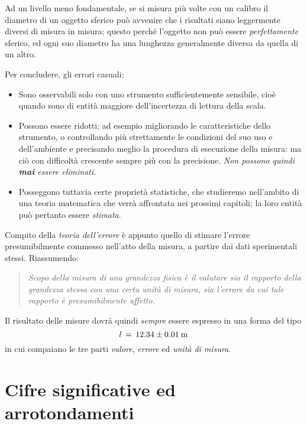 Ad un livello meno fondamentale, se si misura pi\`u volte
con un calibro il diametro di un oggetto sferico pu\`o
avvenire che i risultati siano leggermente diversi di misura
in misura; questo perch\'e l'oggetto non pu\`o essere
\emph{perfettamente} sferico, ed ogni suo diametro ha una
lunghezza generalmente diversa da quella di un altro.

Per concludere, gli errori casuali:
\begin{itemize}
\item Sono osservabili solo con uno strumento
  sufficientemente sensibile, cio\`e quando sono di entit\`a
  maggiore dell'incertezza di lettura della scala.
\item Possono essere ridotti; ad esempio migliorando le
  caratteristiche dello strumento, o controllando pi\`u
  strettamente le condizioni del suo uso e dell'ambiente e
  precisando meglio la procedura di esecuzione della misura:
  ma ci\`o con difficolt\`a crescente sempre pi\`u con la
  precisione.  \emph{Non possono quindi \textbf{mai} essere
    eliminati}.
\item Posseggono tuttavia certe propriet\`a statistiche, che
  studieremo nell'ambito di una teoria matematica che
  verr\`a affrontata nei prossimi capitoli; la loro entit\`a
  pu\`o pertanto essere \emph{stimata}.
\end{itemize}%

Compito della \emph{teoria dell'errore} \`e appunto quello
di stimare l'errore presumibilmente commesso nell'atto della
misura, a partire dai dati sperimentali stessi.
Riassumendo:
\begin{quote}
  \textit{Scopo della misura di una grandezza fisica \`e il
    valutare sia il rapporto della grandezza stessa con una
    certa unit\`a di misura, sia l'errore da cui tale
    rapporto \`e presumibilmente affetto.}
\end{quote}

Il risultato delle misure dovr\`a quindi \emph{sempre}
essere espresso in una forma del tipo
\begin{equation*}
  l \, = \, 12.34 \pm 0.01 \; \un{m}
\end{equation*}
in cui compaiano le tre parti \emph{valore}, \emph{errore}
ed \emph{unit\`a di misura}.

\section{Cifre significative ed arrotondamenti}%
%

